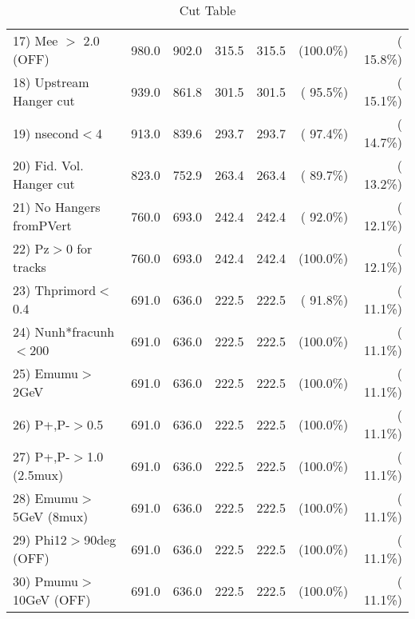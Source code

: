 \begin{table}[h!]
\begin{tabular}{||l||r|r|r|r|r|r||}
 17) Mee $>$ 2.0  (OFF)   &        980.0 &        902.0 &        315.5 &        315.5 & (100.0\%) & ( 15.8\%) \\
 18) Upstream Hanger cut  &        939.0 &        861.8 &        301.5 &        301.5 & ( 95.5\%) & ( 15.1\%) \\
 19) nsecond$<$4          &        913.0 &        839.6 &        293.7 &        293.7 & ( 97.4\%) & ( 14.7\%) \\
 20) Fid. Vol. Hanger cut &        823.0 &        752.9 &        263.4 &        263.4 & ( 89.7\%) & ( 13.2\%) \\
 21) No Hangers fromPVert &        760.0 &        693.0 &        242.4 &        242.4 & ( 92.0\%) & ( 12.1\%) \\
 22) Pz$>$0 for tracks    &        760.0 &        693.0 &        242.4 &        242.4 & (100.0\%) & ( 12.1\%) \\
 23) Thprimord$<$0.4      &        691.0 &        636.0 &        222.5 &        222.5 & ( 91.8\%) & ( 11.1\%) \\
 24) Nunh*fracunh$<$200   &        691.0 &        636.0 &        222.5 &        222.5 & (100.0\%) & ( 11.1\%) \\
 25) Emumu$>$2GeV         &        691.0 &        636.0 &        222.5 &        222.5 & (100.0\%) & ( 11.1\%) \\
 26) P+,P-$>$0.5          &        691.0 &        636.0 &        222.5 &        222.5 & (100.0\%) & ( 11.1\%) \\
 27) P+,P-$>$1.0 (2.5mux) &        691.0 &        636.0 &        222.5 &        222.5 & (100.0\%) & ( 11.1\%) \\
 28) Emumu$>$5GeV  (8mux) &        691.0 &        636.0 &        222.5 &        222.5 & (100.0\%) & ( 11.1\%) \\
 29) Phi12$>$90deg  (OFF) &        691.0 &        636.0 &        222.5 &        222.5 & (100.0\%) & ( 11.1\%) \\
 30) Pmumu$>$10GeV  (OFF) &        691.0 &        636.0 &        222.5 &        222.5 & (100.0\%) & ( 11.1\%) \\
 \hline
 \hline
 \end{tabular}
 \caption{Cut Table           }
 \label{tab-cutcohjpsi-mumu_ccdis}
 \end{table}
